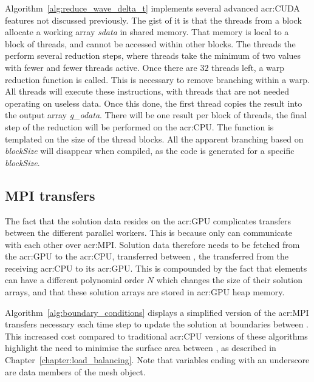 Algorithm~\ref{alg:reduce_wave_delta_t} implements several advanced \acrshort{acr:CUDA} features not
discussed previously. The gist of it is that the threads from a block allocate a working array
\textit{sdata} in shared memory. That memory is local to a block of threads, and cannot be accessed
within other blocks. The threads the perform several reduction steps, where threads take the minimum
of two values with fewer and fewer threads active. Once there are \(32\) threads left, a warp
reduction function is called. This is necessary to remove branching within a warp. All threads will
execute these instructions, with threads that are not needed operating on useless data. Once this
done, the first thread copies the result into the output array \textit{g\_odata}. There will be one
result per block of threads, the final step of the reduction will be performed on the
\acrshort{acr:CPU}. The function is templated on the size of the thread blocks. All the apparent
branching based on \textit{blockSize} will disappear when compiled, as the code is generated for a
specific \textit{blockSize}.

\subsection{MPI transfers}\label{subsection:graphics_processing_units:implementation:mpi_transfers}

The fact that the solution data resides on the \acrshort{acr:GPU} complicates transfers between the
different parallel workers. This is because only  can communicate with each
other over \acrshort{acr:MPI}. Solution data therefore needs to be fetched from the
\acrshort{acr:GPU} to the \acrshort{acr:CPU}, transferred between , the
transferred from the receiving \acrshort{acr:CPU} to its \acrshort{acr:GPU}. This is compounded by
the fact that elements can have a different polynomial order \(N\) which changes the size of their
solution arrays, and that these solution arrays are stored in \acrshort{acr:GPU} heap memory.

Algorithm~\ref{alg:boundary_conditions} displays a simplified version of the \acrshort{acr:MPI}
transfers necessary each time step to update the solution at boundaries between
. This increased cost compared to traditional \acrshort{acr:CPU} versions of
these algorithms highlight the need to minimise the surface area between , as
described in Chapter~\ref{chapter:load_balancing}. Note that variables ending with an underscore are
data members of the mesh object.

